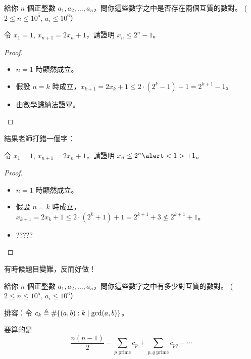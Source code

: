 \documentclass[standalone]{beamer}
\begin{document}
\begin{frame}
  \begin{problem}
    給你 $n$ 個正整數 $a_1, a_2, \dots, a_n$，問你這些數字之中是否存在兩個互質的數對。
    ($2 \leq n \leq 10^5, \, a_i \leq 10^6$）
  \end{problem}
\end{frame}

\begin{frame}
  \begin{problem}[數學歸納法考題]
    令 $x_1 = 1$, $x_{n+1} = 2x_n + 1$，請證明 $x_{n} \leq 2^n - 1$。
  \end{problem} \pause
  \begin{proof}
    \begin{itemize}[<+->]
      \item $n = 1$ 時顯然成立。
      \item 假設 $n = k$ 時成立，$x_{k+1} = 2x_k + 1 \leq 2\cdot(2^k - 1) + 1 = 2^{k+1} - 1$。
      \item 由數學歸納法證畢。
    \end{itemize}
  \end{proof}
\end{frame}

\begin{frame}
  結果老師打錯一個字：
  \begin{problem}
    令 $x_1 = 1$, $x_{n+1} = 2x_n + 1$，請證明 $x_{n} \leq 2^n \alert<1>{+} 1$。
  \end{problem} \pause
  \begin{proof}
    \begin{itemize}[<+->]
      \item $n = 1$ 時顯然成立。
      \item 假設 $n = k$ 時成立，$x_{k+1} = 2x_k + 1 \leq 2\cdot(2^k + 1) + 1 = 2^{k+1} + 3 \nleq 2^{k+1} + 1$。
      \item ?????
    \end{itemize}
  \end{proof}
\end{frame}

\begin{frame}
  有時候題目變難，反而好做！ \pause

  \begin{problem}
    給你 $n$ 個正整數 $a_1, a_2, \dots, a_n$，問你這些數字之中\alert<2>{有多少對互質的數對}。
    ($2 \leq n \leq 10^5, \, a_i \leq 10^6$）
  \end{problem} \pause
  排容：令 $c_k \defeq \sharp\{ (a, b) : k \mid \gcd(a, b) \}$。\pause

  要算的是
  \[ 
    \frac{n(n-1)}{2} - \sum_{p \text{ prime}} c_p + \sum_{p,q \text{ prime}} c_{pq} - \dotsm
  \]
\end{frame}
\end{document}
